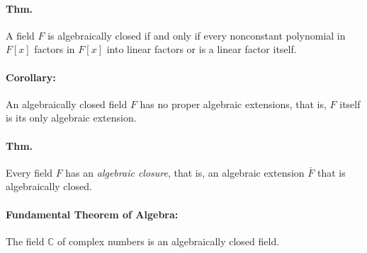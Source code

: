 \documentclass[10pt,a4paper]{article}
\begin{document}
\paragraph{Thm.} A field $F$ is algebraically closed if and only if every nonconstant polynomial in $F[x]$ factors in $F[x]$ into linear factors or is a linear factor itself.

\paragraph{Corollary:} An algebraically closed field $F$ has no proper algebraic extensions, that is, $F$ itself is its only algebraic extension.

\paragraph{Thm.} Every field $F$ has an \textit{algebraic closure}, that is, an algebraic extension $\bar{F}$ that is algebraically closed.

\paragraph{Fundamental Theorem of Algebra:} The field $\mathbb{C}$ of complex numbers is an algebraically closed field.
\end{document}
